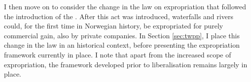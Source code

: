 %
%

I then move on to consider the change in the law on expropriation that followed the introduction of the \cite{wra00}. After this act was introduced, waterfalls and rivers could, for the first time in Norwegian history, be expropriated for purely commercial gain, also by private companies. In Section \ref{sec:twpp}, I place this change in the law in an historical context, before presenting the expropriation framework currently in place. I note that apart from the increased scope of expropriation, the framework developed prior to liberalisation remains largely in place.


